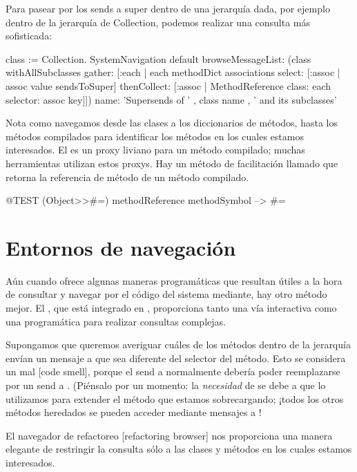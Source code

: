 \documentclass[a4paper,10pt,twoside]{book}
\begin{document}

Para pasear por los sends a super dentro de una jerarqu\'ia dada, por
ejemplo dentro de la jerarqu\'ia de Collection, podemos realizar una
consulta m\'as sofisticada:
\begin{code}{}
class := Collection.
SystemNavigation default
  browseMessageList: (class withAllSubclasses gather: [:each |
    each methodDict associations
      select: [:assoc | assoc value sendsToSuper]
      thenCollect: [:assoc | MethodReference class: each selector: assoc key]])
  name: 'Supersends of ' , class name , ' and its subclasses'
\end{code}
Nota como navegamos desde las clases a los diccionarios de m\'etodos,
hasta los m\'etodos compilados para identificar los m\'etodos en los
cuales estamos interesados.  El  es un proxy
liviano para un m\'etodo compilado; muchas herramientas utilizan estos
proxys.  Hay un m\'etodo de facilitaci\'on llamado
 que retorna la referencia
de m\'etodo de un m\'etodo compilado.
\begin{code}{@TEST}
(Object>>#=) methodReference methodSymbol --> #=
\end{code}

\section{Entornos de navegaci\'on}

A\'un cuando  ofrece algunas maneras
program\'aticas que resultan \'utiles a la hora de consultar y navegar por
el c\'odigo del sistema mediante, hay otro m\'etodo mejor.  El
, que est\'a integrado en \pharo, proporciona
tanto una v\'ia interactiva como una program\'atica para realizar
consultas complejas.

Supongamos que queremos averiguar cu\'ales de los m\'etodos dentro de la
jerarqu\'ia  env\'ian un mensaje a \super que sea diferente
del selector del m\'etodo.  Esto se considera un mal  [code smell], porque el send a \super normalmente deber\'ia
poder reemplazarse por un send a \self. (Pi\'ensalo por un momento: la
\emph{necesidad} de \super se debe a que lo utilizamos para extender
el m\'etodo que estamos sobrecargando; ¡todos los otros m\'etodos
heredados se pueden acceder mediante mensajes a \self!

El navegador de refactoreo [refactoring browser] nos proporciona una
manera elegante de restringir la consulta s\'olo a las clases y m\'etodos
en los cuales estamos interesados.
\end{document}
